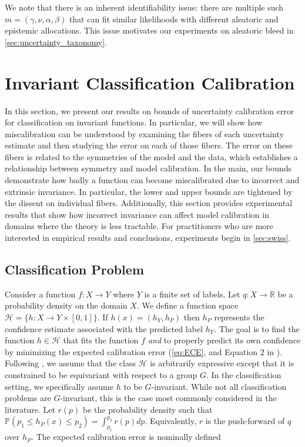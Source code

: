 \documentclass[10pt]{article} %
\theoremstyle{definition}
\begin{document}
We note that there is an inherent identifiability issue: there are multiple such $m = (\gamma, \nu, \alpha, \beta)$ that can fit similar likelihoods with different aleatoric and epistemic allocations. This issue motivates our experiments on aleatoric bleed in \cref{sec:uncertainty_taxonomy}.

\section{Invariant Classification Calibration} \label{sec:class}

In this section, we present our results on bounds of uncertainty calibration error for classification on invariant functions. In particular, we will show how miscalibration can be understood by examining the fibers of each uncertainty estimate and then studying the error on each of those fibers. The error on these fibers is related to the symmetries of the model and the data, which establishes a relationship between symmetry and model calibration. In the main, our bounds demonstrate how badly a function can become miscalibrated due to incorrect and extrinsic invariance. In particular, the lower and upper bounds are tightened by the dissent on individual fibers. Additionally, this section provides experimental results that show how incorrect invariance can affect model calibration in domains where the theory is less tractable. For practitioners who are more interested in empirical results and conclusions, experiments begin in \cref{sec:swiss}.

\subsection{Classification Problem} \label{sec:class_bounds}

Consider a function $f: X \to Y$ where $Y$ is a finite set of labels. Let $q: X \to \mathbb{R}$ be a probability density on the domain $X$. We define a function space 
$\mathscr{H} = \{h: X \to Y \times [0,1]\}$. If $h(x)=(h_Y,h_P)$ then $h_P$ represents the confidence estimate associated with the predicted label $h_Y$. The goal is to find the function $h \in \mathscr{H}$ that fits the function $f$ \textit{and} to properly predict its own confidence by minimizing the expected calibration error (\cref{eq:ECE}, and Equation 2 in \cite{guo2017calibration}). Following \cite{wang2024general}, we assume that the class $\mathscr{H}$ is arbitrarily expressive except that it is constrained to be equivariant with respect to a group $G$. In the classification setting, we specifically assume $h$ to be $G$-invariant. While not all classification problems are $G$-invariant, this is the case most commonly considered in the literature. Let $r(p)$ be the probability density such that $\mathbb{P}(p_1 \leq h_P(x) \leq p_2) = \int_{p_1}^{p_2}r(p)dp$.
Equivalently, $r$ is the push-forward of $q$ over $h_P$. The expected calibration error is nominally defined
\end{document}
